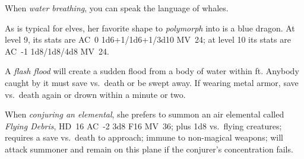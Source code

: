 \documentclass[11pt]{bxart}
\begin{document}
When \emph{water breathing}, you can speak the language of whales.

As is typical for elves, her favorite shape to \emph{polymorph} into
is a blue dragon. At level 9, its stats are AC~0 1d6+1/1d6+1/3d10
MV~24; at level 10 its stats are AC~-1 1d8/1d8/4d8 MV~24.

A \emph{flash flood} will create a sudden flood from a body of water
within \unit[30]{ft}. Anybody caught by it must save vs.~death or be
swept away. If wearing metal armor, save vs.~death again or drown
within a minute or two.
  
When \emph{conjuring an elemental}, she prefers to summon an air
elemental called \emph{Flying Debris}, HD~16 AC~-2 3d8 F16 MV~36; plus
1d8 vs.~flying creatures; requires a save vs.~death to approach;
immune to non-magical weapons; will attack summoner and remain on this
plane if the conjurer's concentration fails.
\end{document}
